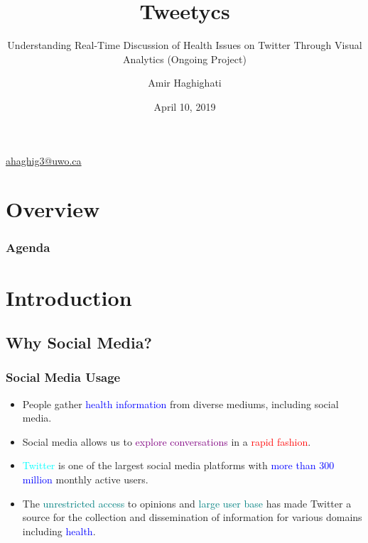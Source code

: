 \documentclass[11pt]{beamer}
\begin{document}
	\author{Amir Haghighati}
	\title{Tweetycs}
	\subtitle{Understanding Real-Time Discussion of Health Issues on Twitter Through Visual Analytics (Ongoing Project)}
	\date{April 10, 2019}
	\subject{UWORCS 2019}
	\begin{frame}
	\maketitle
	\centering\tiny\hyperlink{mailto:ahaghig3@uwo.ca}{ahaghig3@uwo.ca}
\end{frame}

\section*{Overview}
\begin{frame}
\frametitle{Agenda}
\tableofcontents
\end{frame}

\section{Introduction}
\subsection{Why Social Media?}
\begin{frame}
\frametitle{Social Media Usage}
	\begin{itemize}
		\item<1-> People gather \textcolor{blue}{health information} from diverse mediums, including \textcolor{uwo-purple}{social media}.
		\item<2-> Social media allows us to \textcolor{purple}{explore conversations} in a \textcolor{red}{rapid fashion}.
		\item<3-> \textcolor{cyan}{Twitter} is one of the largest social media platforms with \textcolor{blue}{more than 300 million} monthly active users.
		\item<4-> The \textcolor{teal}{unrestricted access} to opinions and \textcolor{teal}{large user base} has made Twitter a source for the collection and dissemination of information for various domains including \textcolor{blue}{health}.	
	\end{itemize}
\end{frame}
\end{document}
